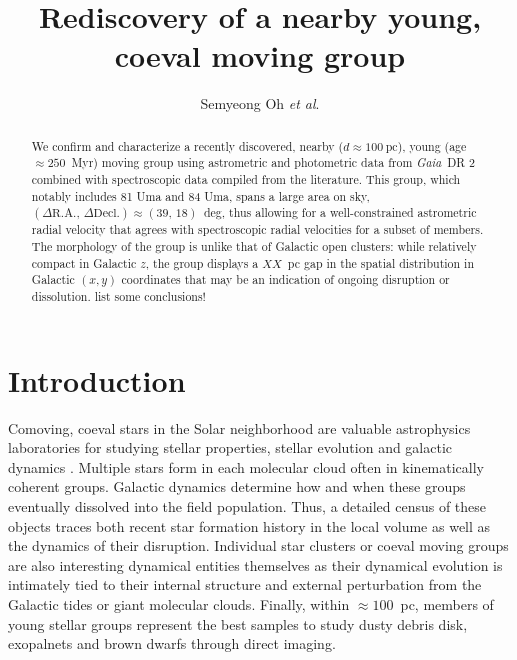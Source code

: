 \documentclass[modern,letterpaper]{aastex61}
\newcommand{\project}[1]{\textsl{#1}}
\newcommand{\gaia}{\project{Gaia}}
\newcommand{\etal}{\textit{et al}.}
\newcommand{\todo}[1]{{\color{crimson}#1}}
\newcommand{\groupDistanceEstimate}{\ensuremath{100~\mathrm{pc}}}
\begin{document}
\sloppy\sloppypar\raggedbottom\frenchspacing %

\title{
  Rediscovery of a nearby young, coeval moving group
}

\author[0000-0001-7790-5308]{Semyeong Oh \etal}


\begin{abstract}

  We confirm and characterize a recently discovered, nearby ($d \approx \groupDistanceEstimate$), young (age$\approx 250$~Myr) moving group using astrometric and photometric data from \gaia\ DR 2 combined with spectroscopic data compiled from the literature.
  This group, which notably includes 81 Uma and 84 Uma, spans a large area
  on sky, $(\Delta\mathrm{R.A.},\,\Delta\mathrm{Decl.})\approx(39,\,18)$~deg,
  thus allowing for a well-constrained astrometric radial velocity that agrees with spectroscopic radial velocities for a subset of members.
  The morphology of the group is unlike that of Galactic open clusters: while relatively compact in Galactic $z$, the group displays a $XX$~pc gap in the spatial distribution in Galactic $(x, y)$ coordinates that may be an indication of ongoing disruption or dissolution.
  \todo{list some conclusions!}

\end{abstract}

\section{Introduction} %
\label{sec:introduction}

Comoving, coeval stars in the Solar neighborhood are valuable astrophysics
laboratories for studying stellar properties, stellar evolution and galactic
dynamics \citep[e.g.,][]{2018arXiv180409378G,2018MNRAS.tmp.1228M}.
Multiple stars form in each molecular cloud often in kinematically coherent
groups.
Galactic dynamics determine how and when these groups eventually  dissolved into
the field population.
Thus, a detailed census of these objects traces both recent star formation
history in the local volume as well as the dynamics of their disruption.
Individual star clusters or coeval moving groups are also interesting dynamical
entities themselves as their dynamical evolution is intimately tied to their
internal structure and external perturbation from the Galactic tides or giant
molecular clouds.
Finally, within $\approx 100$~pc, members of young stellar groups represent the
best samples to study dusty debris disk, exopalnets and brown dwarfs through
direct imaging.
\end{document}
